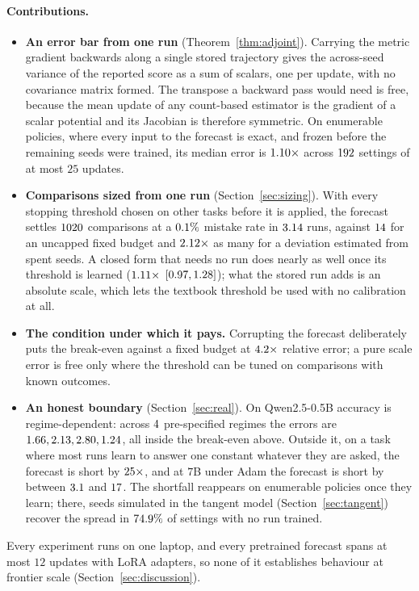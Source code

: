 \paragraph{Contributions.}
\begin{itemize}\itemsep2pt
  \item \textbf{An error bar from one run} (Theorem~\ref{thm:adjoint}). Carrying the metric
  gradient backwards along a single stored trajectory gives the across-seed variance of the
  reported score as a sum of scalars, one per update, with no covariance matrix formed. The
  transpose a backward pass would need is free, because the mean update of any count-based
  estimator is the gradient of a scalar potential and its Jacobian is therefore symmetric. On
  enumerable policies, where every input to the forecast is exact, and frozen before the remaining
  seeds were trained, its median error is $1.10\times$ across
  $192$ settings of at most $25$ updates.

  \item \textbf{Comparisons sized from one run} (Section~\ref{sec:sizing}). With every stopping
  threshold chosen on other tasks before it is applied, the forecast settles $1020$
  comparisons at a $0.1\%$ mistake rate in $3.14$ runs, against
  $14$ for an uncapped fixed budget and
  $2.12\times$ as many for a deviation estimated from spent seeds. A closed
  form that needs no run does nearly as well once its threshold is learned
  ($1.11\times$ $[0.97, 1.28]$); what the
  stored run adds is an absolute scale, which lets the textbook threshold be used with no
  calibration at all.

  \item \textbf{The condition under which it pays.} Corrupting the forecast deliberately puts the
  break-even against a fixed budget at $4.2\times$ relative error; a pure scale
  error is free only where the threshold can be tuned on comparisons with known outcomes.

  \item \textbf{An honest boundary} (Section~\ref{sec:real}). On Qwen2.5-0.5B accuracy is
  regime-dependent: across $4$ pre-specified regimes the errors are
  $1.66, 2.13, 2.80, 1.24$, all inside the break-even above. Outside it, on a task where most runs learn to
  answer one constant whatever they are asked, the forecast is short by $25\times$, and at $7$B under Adam the forecast is short by between
  $3.1$ and $17$. The shortfall reappears on
  enumerable policies once they learn; there, seeds simulated in the tangent model
  (Section~\ref{sec:tangent}) recover the spread in $74.9\%$ of settings
  with no run trained.
\end{itemize}

Every experiment runs on one laptop, and every pretrained forecast spans at most $12$ updates with
LoRA adapters, so none of it establishes behaviour at frontier scale (Section~\ref{sec:discussion}).
